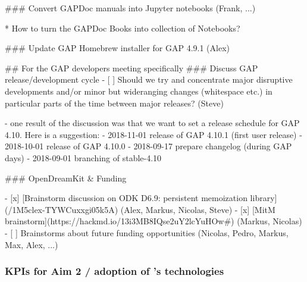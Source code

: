 \begin{Aim 1}
### Convert GAPDoc manuals into Jupyter notebooks (Frank, ...)

* How to turn the GAPDoc Books into collection of Notebooks?

### Update GAP Homebrew installer for GAP 4.9.1 (Alex)

## For the GAP developers meeting specifically
### Discuss GAP release/development cycle 
- [ ] Should we try and concentrate major disruptive developments and/or minor but wideranging changes (whitespace etc.) in particular parts of the time between major releases? (Steve)

- one result of the discussion was that we want to set a release schedule for GAP 4.10. Here is a suggestion:
  - 2018-11-01 release of GAP 4.10.1 (first user release)
  - 2018-10-01 release of GAP 4.10.0
  - 2018-09-17 prepare changelog (during GAP days)
  - 2018-09-01 branching of stable-4.10

### OpenDreamKit & Funding

- [x] [Brainstorm discussion on ODK D6.9: persistent memoization library](/1M5clex-TYWCuxxgi05k5A) (Alex, Markus, Nicolas, Steve)
- [x] [MitM brainstorm](https://hackmd.io/13i3MB8IQse2uY2lcYuHOw#) (Markus, Nicolas)
- [ ] Brainstorms about future funding opportunities (Nicolas, Pedro, Markus, Max, Alex, ...)



\subsubsection{KPIs for Aim 2 / adoption of \ODK's technologies}

\end{Aim 1}
